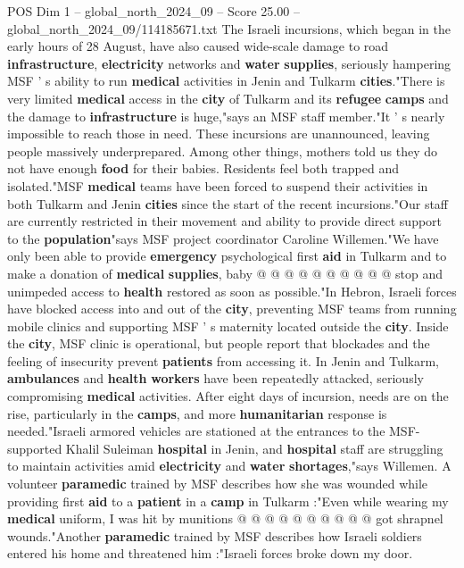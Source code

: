 \begin{textsample}{POS Dim 1 – global\_north\_2024\_09 – Score 25.00 – global\_north\_2024\_09/114185671.txt}  \label{ex:f1_pos_427}
The Israeli incursions, which began in the early hours of 28 August, have also caused wide-scale damage to road \textbf{infrastructure}, \textbf{electricity} networks and \textbf{water} \textbf{supplies}, seriously hampering MSF ' s ability to run \textbf{medical} activities in Jenin and Tulkarm \textbf{cities}."There is very limited \textbf{medical} access in the \textbf{city} of Tulkarm and its \textbf{refugee} \textbf{camps} and the damage to \textbf{infrastructure} is huge,"says an MSF staff member."It ' s nearly impossible to reach those in need.
These incursions are unannounced, leaving people massively underprepared.
Among other things, mothers told us they do not have enough \textbf{food} for their babies.
Residents feel both trapped and isolated."MSF \textbf{medical} teams have been forced to suspend their activities in both Tulkarm and Jenin \textbf{cities} since the start of the recent incursions."Our staff are currently restricted in their movement and ability to provide direct support to the \textbf{population}"says MSF project coordinator Caroline Willemen."We have only been able to provide \textbf{emergency} psychological first \textbf{aid} in Tulkarm and to make a donation of \textbf{medical} \textbf{supplies}, baby @ @ @ @ @ @ @ @ @ @ stop and unimpeded access to \textbf{health} restored as soon as possible."In Hebron, Israeli forces have blocked access into and out of the \textbf{city}, preventing MSF teams from running mobile clinics and supporting MSF ' s maternity located outside the \textbf{city}.
Inside the \textbf{city}, MSF clinic is operational, but people report that blockades and the feeling of insecurity prevent \textbf{patients} from accessing it.
In Jenin and Tulkarm, \textbf{ambulances} and \textbf{health} \textbf{workers} have been repeatedly attacked, seriously compromising \textbf{medical} activities.
After eight days of incursion, needs are on the rise, particularly in the \textbf{camps}, and more \textbf{humanitarian} response is needed."Israeli armored vehicles are stationed at the entrances to the MSF-supported Khalil Suleiman \textbf{hospital} in Jenin, and \textbf{hospital} staff are struggling to maintain activities amid \textbf{electricity} and \textbf{water} \textbf{shortages},"says Willemen.
A volunteer \textbf{paramedic} trained by MSF describes how she was wounded while providing first \textbf{aid} to a \textbf{patient} in a \textbf{camp} in Tulkarm :"Even while wearing my \textbf{medical} uniform, I was hit by munitions @ @ @ @ @ @ @ @ @ @ got shrapnel wounds."Another \textbf{paramedic} trained by MSF describes how Israeli soldiers entered his home and threatened him :"Israeli forces broke down my door.

\end{textsample}
